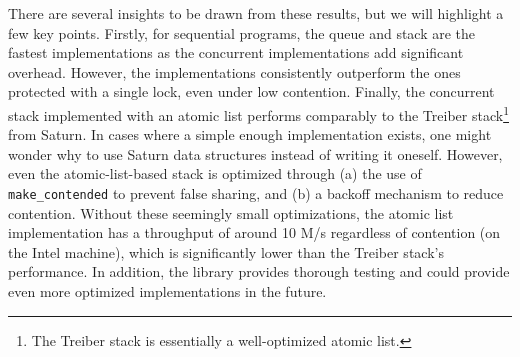 \documentclass[a4paper, 11pt]{article}
\begin{document}
There are several insights to be drawn from these results, but we will highlight a few key points. Firstly, for sequential programs, the \Stdlib queue and stack are the fastest implementations as the concurrent implementations add significant overhead. However, the \Saturn implementations consistently outperform the \Stdlib ones protected with a single lock, even under low contention. Finally, the concurrent stack implemented with an atomic list performs comparably to the Treiber stack\footnote{The Treiber stack is essentially a well-optimized atomic list.} from Saturn. In cases where a simple enough implementation exists, one might wonder why to use Saturn data structures instead of writing it oneself. However, even the atomic-list-based stack is optimized through
(a) the use of \texttt{make\_contended} to prevent false sharing, and
(b) a backoff mechanism to reduce contention.
Without these seemingly small optimizations, the atomic list implementation has a throughput of around 10 M/s regardless of contention (on the Intel machine), which is significantly lower than the Treiber stack's performance. In addition, the \Saturn library provides thorough testing and could provide even more optimized implementations in the future.
\end{document}
